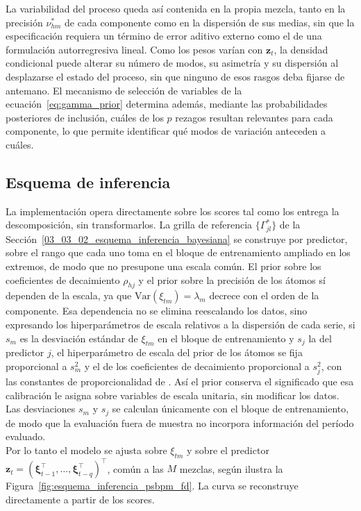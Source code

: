 La variabilidad del proceso queda así contenida en la propia mezcla, tanto en la precisión $\nu_{hm}^*$ de cada componente como en la dispersión de sus medias, sin que la especificación requiera un término de error aditivo externo como el de una formulación autorregresiva lineal. Como los pesos varían con $\mathbf{z}_t$, la densidad condicional puede alterar su número de modos, su asimetría y su dispersión al desplazarse el estado del proceso, sin que ninguno de esos rasgos deba fijarse de antemano. El mecanismo de selección de variables de la ecuación~\eqref{eq:gamma_prior} determina además, mediante las probabilidades posteriores de inclusión, cuáles de los $p$ rezagos resultan relevantes para cada componente, lo que permite identificar qué modos de variación anteceden a cuáles.

\subsection{Esquema de inferencia}
\label{03_04_01_esquema_inferencia}

La implementación opera directamente sobre los scores tal como los entrega la descomposición, sin transformarlos. La grilla de referencia $\{\Gamma_{jl}^*\}$ de la Sección~\ref{03_03_02_esquema_inferencia_bayesiana} se construye por predictor, sobre el rango que cada uno toma en el bloque de entrenamiento ampliado en los extremos, de modo que no presupone una escala común. El prior sobre los coeficientes de decaimiento $\rho_{hj}$ y el prior sobre la precisión de los átomos sí dependen de la escala, ya que $\mathrm{Var}(\xi_{tm}) = \lambda_m$ decrece con el orden de la componente. Esa dependencia no se elimina reescalando los datos, sino expresando los hiperparámetros de escala relativos a la dispersión de cada serie, si $s_m$ es la desviación estándar de $\xi_{tm}$ en el bloque de entrenamiento y $s_j$ la del predictor $j$, el hiperparámetro de escala del prior de los átomos se fija proporcional a $s_m^{2}$ y el de los coeficientes de decaimiento proporcional a $s_j^{2}$, con las constantes de proporcionalidad de \citet{03_02_chung2009nonparametric}. Así el prior conserva el significado que esa calibración le asigna sobre variables de escala unitaria, sin modificar los datos. Las desviaciones $s_m$ y $s_j$ se calculan únicamente con el bloque de entrenamiento, de modo que la evaluación fuera de muestra no incorpora información del período evaluado.\\

Por lo tanto el modelo se ajusta sobre $\xi_{tm}$ y sobre el predictor $\mathbf{z}_t = (\boldsymbol{\xi}_{t-1}^\top, \dots, \boldsymbol{\xi}_{t-q}^\top)^\top$, común a las $M$ mezclas, según ilustra la Figura~\ref{fig:esquema_inferencia_psbpm_fd}. La curva se reconstruye directamente a partir de los scores.\\

